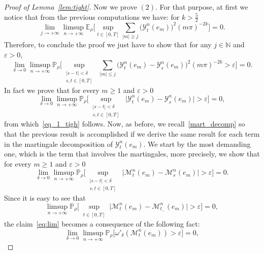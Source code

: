 \documentclass[AHL,Unicode,longabstracts]{cedram}
\renewcommand{\leq}{\leqslant}
\renewcommand{\geq}{\geqslant}
\renewcommand{\epsilon}{\varepsilon}
\begin{document}
\begin{proof}[Proof of Lemma~\ref{lem:tight}]
Now we prove $(2)$. For that purpose, at first we notice that from the previous computations we have: for $k>\frac52$
\begin{equation*}
\lim_{j\rightarrow{+\infty}}\limsup_{n\rightarrow{+\infty}}\mathbb{E}_{\rho}\bigg[\sup_{t\in[0,T]}\sum_{|m|\geq{j}}
\Big(\mathcal Y^n_{t}(e_m)\Big)^{2}(m\pi)^{-2k}\bigg]=0.
\end{equation*}
Therefore, to conclude the proof we just have to show that for any $j\in{\mathbb{N}}$ and $\epsilon>{0}$,
\begin{equation}\label{eq_1_tigh}
\lim_{\delta\rightarrow{0}}\limsup_{n\rightarrow{+\infty}}\mathbb{P}_{\rho}
\Bigg[\sup_{\substack{|s-t|<\delta\\s,t\in[0,T]}}\;\sum_{|m|\leq{j}}\Big(\mathcal Y^n_{t}(e_m)-{\mathcal Y}^n_{s}(e_{m})\Big)^{2}(m\pi)^{-2k}>\epsilon\Bigg]=0.
\end{equation}
In fact we prove that for every $m\geq 1$ and $\epsilon>0$
\begin{equation*}
\lim_{\delta\rightarrow{0}}\limsup_{n\rightarrow{+\infty}}\mathbb{P}_{\rho}\Bigg[\sup_{\substack{|s-t|<\delta\\s,t\in[0,T]}}\;
\Big|\mathcal Y^n_{t}(e_m)-{\mathcal Y}^n_{s}(e_{m})\Big|>\epsilon\Bigg]=0,
\end{equation*}
from which~\eqref{eq_1_tigh} follows. Now, as before, we recall~\eqref{mart_decomp} so that the previous result is accomplished if we derive the same result for each term in the martingale decomposition of $\mathcal Y_t^n(e_m)$. We start by the most demanding one, which is the term that involves the martingales, more precisely, we show that for every $m\geq 1$ and $\epsilon>0$
\begin{equation}\label{eq:lim}
\lim_{\delta\rightarrow{0}}\limsup_{n\rightarrow{+\infty}}\mathbb{P}_{\rho}\Bigg[\sup_{\substack{|s-t|<\delta\\s,t\in[0,T]}}\;
\big|\mathcal{M}_{t}^{n}(e_m)-\mathcal{M}_{s}^{n}(e_m)\big|>\epsilon\Bigg]=0.
\end{equation}
Since it is easy to see that
\begin{equation*}
\limsup_{n\rightarrow{+\infty}}\mathbb{P}_{\rho}\bigg[\sup_{\substack{t\in[0,T]}}\big|\mathcal{M}_{t}^{n}(e_m)-\mathcal{M}_{t_{-}}^{n}(e_m)\big|>\epsilon\bigg]=0,
\end{equation*}
the claim~\eqref{eq:lim} becomes a consequence of the following fact:
\begin{equation*}
\lim_{\delta\rightarrow{0}}\limsup_{n\rightarrow{+\infty}}\mathbb{P}_{\rho}\Big[\omega'_{\delta}(\mathcal{M}_{t}^{n}(e_m))>\epsilon\Big]=0,

\end{equation*}
\end{proof}
\end{document}
